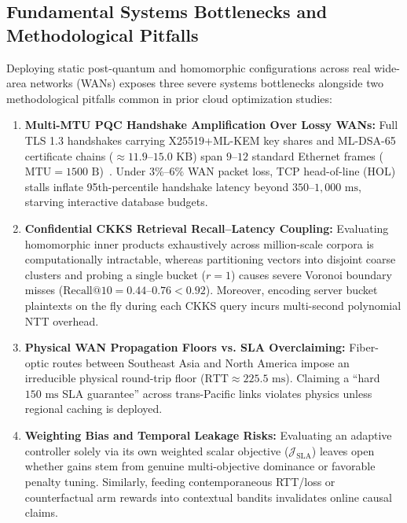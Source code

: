 \documentclass[10pt,journal,compsoc]{IEEEtran}
\begin{document}
\subsection{Fundamental Systems Bottlenecks and Methodological Pitfalls}
Deploying static post-quantum and homomorphic configurations across real wide-area networks (WANs) exposes three severe systems bottlenecks alongside two methodological pitfalls common in prior cloud optimization studies:
\begin{enumerate}
    \item \textbf{Multi-MTU PQC Handshake Amplification Over Lossy WANs:} Full TLS 1.3 handshakes carrying X25519+ML-KEM key shares and ML-DSA-65 certificate chains ($\approx 11.9$--$15.0\text{ KB}$) span $9$--$12$ standard Ethernet frames ($\text{MTU}=1500\text{ B}$)~\cite{paupamah2024pqctls}. Under $3\%$--$6\%$ WAN packet loss, TCP head-of-line (HOL) stalls inflate 95th-percentile handshake latency beyond $350$--$1,000\text{ ms}$, starving interactive database budgets.
    \item \textbf{Confidential CKKS Retrieval Recall--Latency Coupling:} Evaluating homomorphic inner products exhaustively across million-scale corpora is computationally intractable, whereas partitioning vectors into disjoint coarse clusters and probing a single bucket ($r=1$) causes severe Voronoi boundary misses ($\text{Recall@10} = 0.44$--$0.76 < 0.92$). Moreover, encoding server bucket plaintexts on the fly during each CKKS query incurs multi-second polynomial NTT overhead.
    \item \textbf{Physical WAN Propagation Floors vs. SLA Overclaiming:} Fiber-optic routes between Southeast Asia and North America impose an irreducible physical round-trip floor ($\text{RTT} \approx 225.5\text{ ms}$). Claiming a ``hard $150\text{ ms}$ SLA guarantee'' across trans-Pacific links violates physics unless regional caching is deployed.
    \item \textbf{Weighting Bias and Temporal Leakage Risks:} Evaluating an adaptive controller solely via its own weighted scalar objective ($\mathcal{J}_{\text{SLA}}$) leaves open whether gains stem from genuine multi-objective dominance or favorable penalty tuning. Similarly, feeding contemporaneous RTT/loss or counterfactual arm rewards into contextual bandits invalidates online causal claims.
\end{enumerate}
\end{document}
